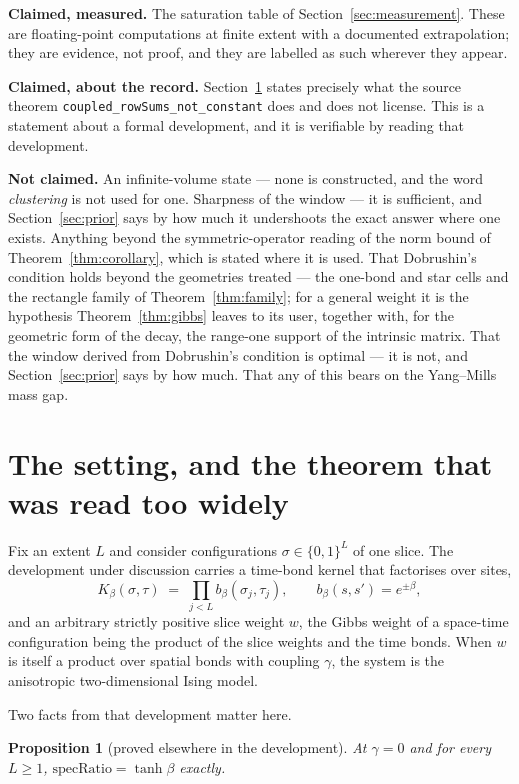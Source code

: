 \documentclass[11pt]{article}
\newtheorem{proposition}[theorem]{Proposition}
\theoremstyle{definition}
\newcommand{\specRatio}{\mathrm{specRatio}}
\begin{document}
\textbf{Claimed, measured.}  The saturation table of
Section~\ref{sec:measurement}.  These are floating-point computations at finite
extent with a documented extrapolation; they are evidence, not proof, and they
are labelled as such wherever they appear.

\textbf{Claimed, about the record.}  Section~\ref{sec:reading} states precisely
what the source theorem \texttt{coupled\_rowSums\_not\_constant} does and does
not license.  This is a statement about a formal development, and it is
verifiable by reading that development.

\textbf{Not claimed.}  An infinite-volume state --- none is constructed,
and the word \emph{clustering} is not used for one.  Sharpness of the
window --- it is sufficient, and Section~\ref{sec:prior} says by how much
it undershoots the exact answer where one exists.  Anything beyond the
symmetric-operator reading of the norm bound of
Theorem~\ref{thm:corollary}, which is stated where it is used.
That Dobrushin's condition holds beyond the geometries treated --- the
one-bond and star cells and the rectangle family of
Theorem~\ref{thm:family}; for a general weight it is the
hypothesis Theorem~\ref{thm:gibbs} leaves to its user, together with, for the
geometric form of the decay, the range-one support of the intrinsic matrix.  That the window
derived from
Dobrushin's condition is optimal --- it is not, and Section~\ref{sec:prior} says
by how much.  That any of this bears on the Yang--Mills mass gap.

\section{The setting, and the theorem that was read too widely}
\label{sec:reading}

Fix an extent $L$ and consider configurations $\sigma\in\{0,1\}^{L}$ of one
slice.  The development under discussion carries a time-bond kernel that
factorises over sites,
\[
  K_\beta(\sigma,\tau)\;=\;\prod_{j<L} b_\beta(\sigma_j,\tau_j),
  \qquad b_\beta(s,s')=e^{\pm\beta},
\]
and an arbitrary strictly positive slice weight $w$, the Gibbs weight of a
space-time configuration being the product of the slice weights and the time
bonds.  When $w$ is itself a product over spatial bonds with coupling $\gamma$,
the system is the anisotropic two-dimensional Ising model.

Two facts from that development matter here.

\begin{proposition}[proved elsewhere in the development]
\label{prop:decoupled}
At $\gamma=0$ and for every $L\ge1$, $\specRatio=\tanh\beta$ exactly.
\end{proposition}
\end{document}
